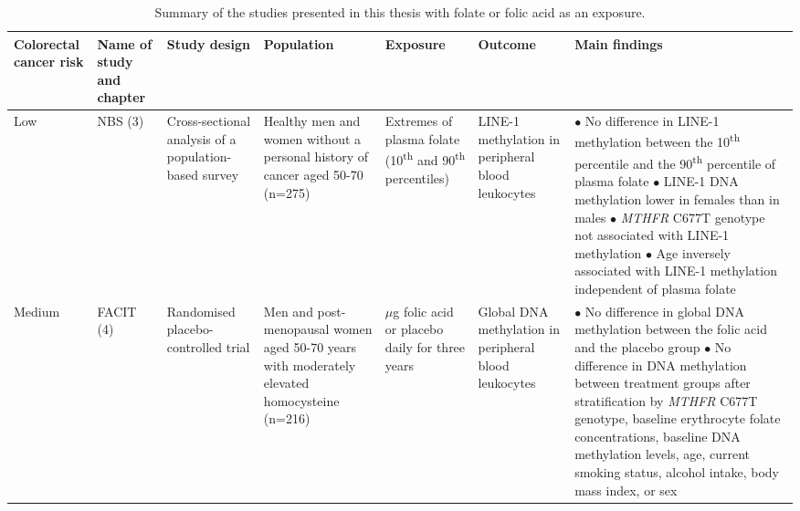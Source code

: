 \begin{sidewaystable}
\footnotesize
\caption{Summary of the studies presented in this thesis with folate or folic acid as an exposure.} 
\label{table7_1}
\begin{tabular}{L{1.3cm}C{1.5cm}C{2cm}C{2.1cm}C{2.1cm}C{2.1cm}C{4cm}}
\hline
\bfseries Colorectal cancer risk & \bfseries Name of study and chapter & \bfseries Study design & \bfseries Population & \bfseries Exposure & \bfseries Outcome & \bfseries Main findings\\
\hline
\parbox[t][5cm]{1.3cm}{Low} &
\parbox[t][5cm]{1.5cm}{\centering NBS (3)} &
\parbox[t][5cm]{2cm}{\centering Cross-sectional analysis of a population-based survey} &
\parbox[t][5cm]{2.1cm}{\centering Healthy men and women without a personal history of cancer aged 50-70 (n=275)} &
\parbox[t][5cm]{2.1cm}{\centering Extremes of plasma folate (10\textsuperscript{th} and 90\textsuperscript{th} percentiles)} &
\parbox[t][5cm]{2.1cm}{\centering LINE-1 methylation in peripheral blood leukocytes} & 
\parbox[t][5cm]{4cm}{ \centering $\bullet$ No difference in LINE-1 methylation between the 10\textsuperscript{th} percentile and the 90\textsuperscript{th} percentile of plasma folate\\
$\bullet$ LINE-1 DNA methylation lower in females than in males\\
$\bullet$ \emph{MTHFR} C677T genotype not associated with LINE-1 methylation\\
$\bullet$ Age inversely associated with LINE-1 methylation independent of plasma folate}\\

\parbox[t][5cm]{1.3cm}{Medium} &
\parbox[t][5cm]{1.5cm}{\centering FACIT (4)} &
\parbox[t][5cm]{2cm}{\centering Randomised placebo-controlled trial} &
\parbox[t][5cm]{2.1cm}{\centering Men and post-menopausal women aged 50-70 years with moderately elevated homocysteine (n=216)} &
\parbox[t][5cm]{2.1cm}{ $\mu$g folic acid or placebo daily for three years} &
\parbox[t][5cm]{2.1cm}{\centering Global DNA methylation in peripheral blood leukocytes} &
\parbox[t][5cm]{4cm}{ \centering $\bullet$ No difference in global DNA methylation between the folic acid and the placebo group \\ $\bullet$ No difference in DNA methylation between treatment groups after stratification by \textit{MTHFR} C677T genotype, baseline erythrocyte folate concentrations, baseline DNA methylation levels, age, current smoking status, alcohol intake, body mass index, or sex}\\
\end{tabular}
\end{sidewaystable}


